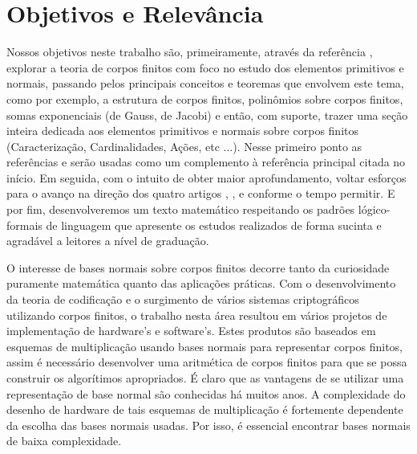 \documentclass[12pt,twoside]{article}
\begin{document}
  \section*{Objetivos e Relevância}
    Nossos objetivos neste trabalho são, primeiramente, através da referência \cite[Finite fields]{finite-fields-1997}, 
    explorar a teoria de corpos finitos com foco no estudo dos elementos primitivos e normais, passando
    pelos principais conceitos e teoremas que envolvem este tema, como por exemplo, a
    estrutura de corpos finitos, polinômios sobre corpos finitos, somas exponenciais (de
    Gauss, de Jacobi) e então, com suporte, trazer uma seção inteira dedicada aos
    elementos primitivos e normais sobre corpos finitos (Caracterização, Cardinalidades,
    Ações, etc ...). Nesse primeiro ponto as referências \cite[Tópicos de álgebra]{topicos-de-algebra-1970} 
    e \cite[Abstract algebra]{abstract-algebra-2007} serão usadas como um complemento à referência principal citada no início.
    Em seguida, com o intuito de obter maior aprofundamento, voltar esforços para o avanço na direção dos quatro 
    artigos \cite[Primitive normal bases for finite fields]{article-1987}, 
    \cite[Pairs of primitive elements in fields of even order]{article-2014},
    \cite[Existence of some special primitive normal elements over finite fields]{article-2017} e 
    \cite[On primitive normal elements over finite fields]{article-2018} conforme o tempo permitir.
    E por fim, desenvolveremos um texto matemático respeitando os padrões lógico-formais de linguagem que apresente 
    os estudos realizados de forma sucinta e agradável a leitores a nível de graduação.

    O interesse de bases normais sobre corpos finitos decorre tanto da
    curiosidade puramente matemática quanto das aplicações práticas. Com o
    desenvolvimento da teoria de codificação e o surgimento de vários sistemas
    criptográficos utilizando corpos finitos, o trabalho nesta área resultou em vários
    projetos de implementação de hardware's e software's. Estes produtos são
    baseados em esquemas de multiplicação usando bases normais para representar
    corpos finitos, assim é necessário desenvolver uma aritmética de corpos finitos para
    que se possa construir os algorítimos apropriados. É claro que as vantagens de se
    utilizar uma representação de base normal são conhecidas há muitos anos. A
    complexidade do desenho de hardware de tais esquemas de multiplicação é
    fortemente dependente da escolha das bases normais usadas. Por isso, é essencial
    encontrar bases normais de baixa complexidade. \\
    
    \newpage %

  \thispagestyle{empty} %
\end{document}
